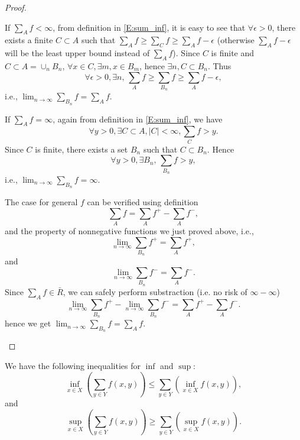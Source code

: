 \begin{proof}
\begin{enumerate}
  If $\sum_A f<\infty$, from definition in \ref{E:sum_inf}, it is easy to see 
  that $\forall \epsilon>0$, there exists a finite $C\subset A$ such that
  $\sum_A f\ge \sum_C f\ge \sum_A f-\epsilon$ (otherwise $\sum_A f-\epsilon$ 
  will be the least upper bound instead of $\sum_A f$). Since $C$ is finite and
  $C\subset A=\cup_n B_n$, $\forall x\in C,\exists m, x\in B_m$, hence 
  $\exists n, C\subset B_n$. Thus 
  \[
    \forall \epsilon>0, \exists n, \,
      \sum_A f\ge \sum_{B_n} f\ge \sum_A f-\epsilon,
  \]
  i.e., $\lim_{n\to \infty} \sum_{B_n} f=\sum_A f$.

  If $\sum_A f=\infty$, again from definition in \ref{E:sum_inf}, we have
  \[
    \forall y>0, \exists C\subset A, |C|<\infty, \sum_C f>y.
  \]
  Since $C$ is finite, there exists a set $B_n$ such that $C\subset B_n$. Hence
  \[
    \forall y>0, \exists B_n,\, \sum_{B_n} f>y,
  \]
  i.e., $\lim_{n\to \infty} \sum_{B_n} f=\infty$.
  
  The case for general $f$ can be verified using definition
  \[
    \sum_A f = \sum_A f^+ - \sum_A f^-,
  \]
  and the property of nonnegative functions we just proved above, i.e.,
  \[
    \lim_{n\to\infty} \sum_{B_n} f^+ =\sum_A f^+,
  \]
  and 
  \[
    \lim_{n\to\infty} \sum_{B_n} f^- =\sum_A f^-.
  \]
  Since $\sum_A f\in \bar{R}$, we can safely perform substraction (i.e. no risk
  of $\infty-\infty$)
  \[
    \lim_{n\to\infty} \sum_{B_n} f^+ - \lim_{n\to\infty} \sum_{B_n} f^- 
      =\sum_A f^+ - \sum_A f^-.
  \]
  hence we get $\lim_{n\to \infty} \sum_{B_n} f=\sum_A f$.
\end{enumerate}
\end{proof}

\begin{lemma} \label{L:sum_inf}
We have the following inequalities for $\inf$ and $\sup$:
\begin{equation}
  \inf_{x\in X} \left( \sum_{y\in Y} f(x,y) \right)
    \le \sum_{y\in Y} \left( \inf_{x\in X} f(x,y) \right),
\end{equation}
and 
\begin{equation}
  \sup_{x\in X} \left( \sum_{y\in Y} f(x,y) \right)
    \ge \sum_{y\in Y} \left( \sup_{x\in X} f(x,y) \right).
\end{equation}
\end{lemma}

